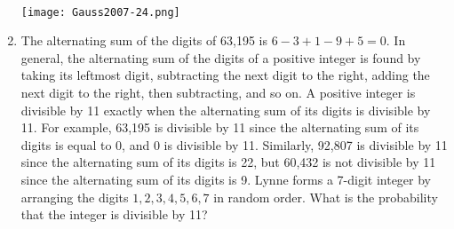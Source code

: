 \documentclass[12pt]{extarticle}
\begin{document}
\begin{enumerate}
{    \\ \texttt{[image: Gauss2007-24.png]}} %
    \item {The alternating sum of the digits of 63,195 is $6-3+1-9+5=0$. In general, the alternating sum of the digits of a positive integer is found by taking its leftmost digit, subtracting the next digit to the right, adding the next digit to the right, then subtracting, and so on. A positive integer is divisible by 11 exactly when the alternating sum of its digits is divisible by 11. For example, 63,195 is divisible by 11 since the alternating sum of its digits is equal to 0, and 0 is divisible by 11. Similarly, 92,807 is divisible by 11 since the alternating sum of its digits is 22, but 60,432 is not divisible by 11 since the alternating sum of its digits is 9. Lynne forms a 7-digit integer by arranging the digits $1,2,3,4,5,6,7$ in random order. What is the probability that the integer is divisible by 11?} %
\end{enumerate}
\end{document}
